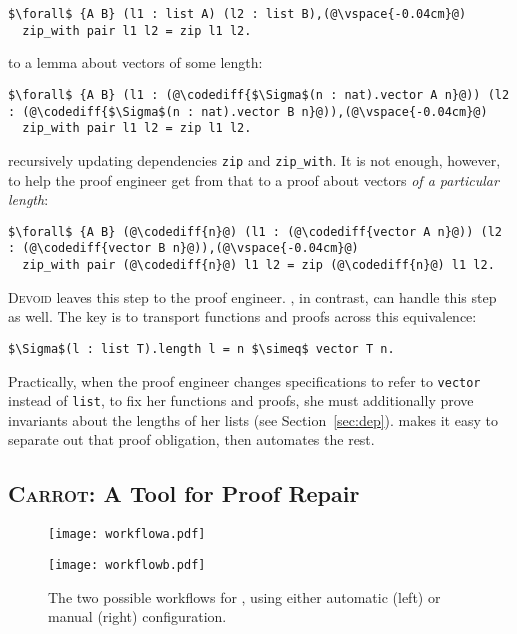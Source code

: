 \begin{lstlisting}
$\forall$ {A B} (l1 : list A) (l2 : list B),(@\vspace{-0.04cm}@)
  zip_with pair l1 l2 = zip l1 l2.
\end{lstlisting}
to a lemma about vectors of some length:

\begin{lstlisting}
$\forall$ {A B} (l1 : (@\codediff{$\Sigma$(n : nat).vector A n}@)) (l2 : (@\codediff{$\Sigma$(n : nat).vector B n}@)),(@\vspace{-0.04cm}@)
  zip_with pair l1 l2 = zip l1 l2.
\end{lstlisting}
recursively updating dependencies \lstinline{zip} and \lstinline{zip_with}.
It is not enough, however, to help the proof engineer get from that to a proof about vectors \textit{of a particular length}:

\begin{lstlisting}
$\forall$ {A B} (@\codediff{n}@) (l1 : (@\codediff{vector A n}@)) (l2 : (@\codediff{vector B n}@)),(@\vspace{-0.04cm}@)
  zip_with pair (@\codediff{n}@) l1 l2 = zip (@\codediff{n}@) l1 l2.
\end{lstlisting}

\textsc{Devoid} leaves this step to the proof engineer.
\toolname, in contrast, can handle this step as well.
The key is to transport functions and proofs across this equivalence:

\begin{lstlisting}
$\Sigma$(l : list T).length l = n $\simeq$ vector T n.
\end{lstlisting}
Practically, when the proof engineer changes specifications to refer to \lstinline{vector} instead of \lstinline{list},
to fix her functions and proofs, she must additionally prove invariants about the lengths of her lists (see Section~\ref{sec:dep}).
\toolname makes it easy to separate out that proof obligation, then automates the rest.

\subsection{\textsc{Carrot}: A Tool for Proof Repair}
\label{sec:time}

\begin{figure}
\begin{minipage}{0.52\textwidth}
\texttt{[image: workflowa.pdf]}
\end{minipage}
\hfill
\begin{minipage}{0.45\textwidth}
\texttt{[image: workflowb.pdf]}
\vspace{0.97cm}
\end{minipage}
\vspace{-0.4cm}
\caption{The two possible workflows for \toolname, using either automatic (left) or manual (right) configuration.}
\label{fig:system}
\end{figure}

